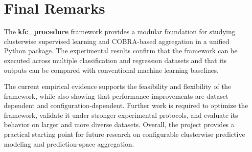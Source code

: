 \section{Final Remarks}
\label{sec:final_remarks}

\hs The \textbf{kfc\_procedure} framework provides a modular foundation for studying clusterwise supervised learning and COBRA-based aggregation in a unified Python package. The experimental results confirm that the framework can be executed across multiple classification and regression datasets and that its outputs can be compared with conventional machine learning baselines.

The current empirical evidence supports the feasibility and flexibility of the framework, while also showing that performance improvements are dataset-dependent and configuration-dependent. Further work is required to optimize the framework, validate it under stronger experimental protocols, and evaluate its behavior on larger and more diverse datasets. Overall, the project provides a practical starting point for future research on configurable clusterwise predictive modeling and prediction-space aggregation.
